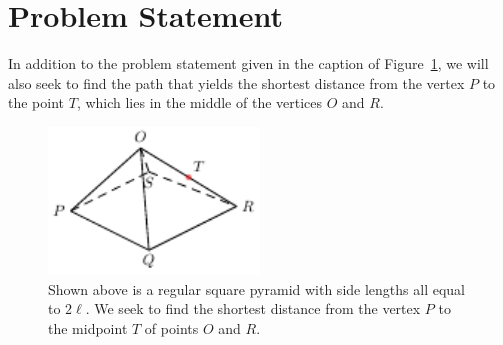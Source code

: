 \section{Problem Statement}
\label{sec:statement}

In addition to the problem statement given in the caption of
Figure~\ref{fig:problem}, we will also seek to find the path that yields the
shortest distance from the vertex $P$ to the point $T$, which lies in the middle
of the vertices $O$ and $R$.

\begin{figure}[h]
  \centering
  \includegraphics[trim={0 0 0 0cm},clip,width=0.5\textwidth]{./figures/pyramid.pdf}
  \vspace{-8mm}
  \caption{Shown above is a regular square pyramid with side lengths all
  equal to $2\ell$. We seek to find the shortest distance from the vertex
  $P$ to the midpoint $T$ of points $O$ and $R$.}
  \label{fig:problem}
\end{figure}


